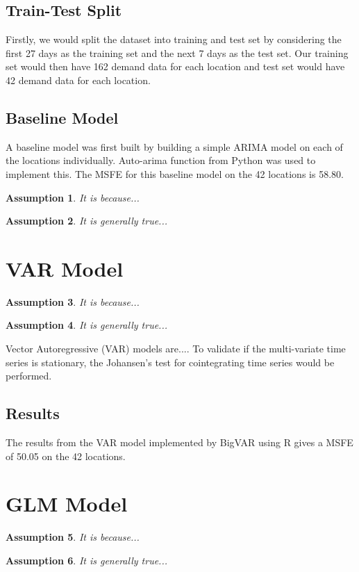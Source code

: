 \documentclass[10pt, letterpaper] {article}
\newtheorem{assumption}{Assumption}
\begin{document}
\subsection{Train-Test Split}
Firstly, we would split the dataset into training and test set by considering the first 27 days as the training set and the next 7 days as the test set. Our training set would then have 162 demand data for each location and test set would have 42 demand data for each location. 

\subsection{Baseline Model}
A baseline model was first built by building a simple ARIMA model on each of the locations individually. Auto-arima function from Python was used to implement this. The MSFE for this baseline model on the 42 locations is 58.80. 
\begin{assumption}
It is because...
\end{assumption}
\begin{assumption}
It is generally true...
\end{assumption}

\section{VAR Model}
\begin{assumption}
It is because...
\end{assumption}
\begin{assumption}
It is generally true...
\end{assumption}
Vector Autoregressive (VAR) models are....
To validate if the multi-variate time series is stationary, the Johansen's test for cointegrating time series would be performed. 
\subsection{Results}
The results from the VAR model implemented by BigVAR using R gives a MSFE of 50.05 on the 42 locations. 
\section{GLM Model}
\begin{assumption}
It is because...
\end{assumption}
\begin{assumption}
It is generally true...
\end{assumption}
\end{document}
